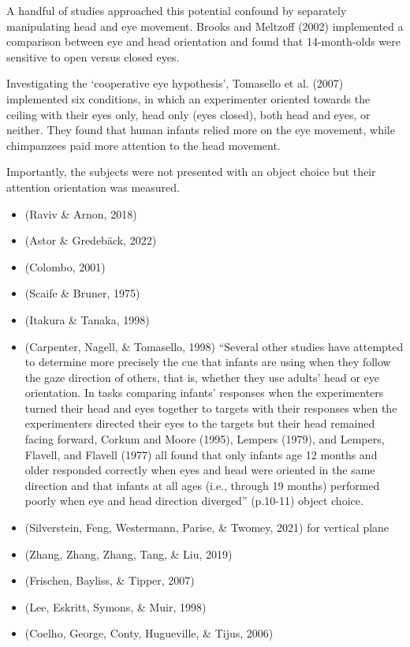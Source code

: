 \documentclass[
  man,floatsintext]{apa6}
\begin{document}
A handful of studies approached this potential confound by separately manipulating head and eye movement.
Brooks and Meltzoff (2002) implemented a comparison between eye and head orientation and found that 14-month-olds were sensitive to open versus closed eyes.

Investigating the `cooperative eye hypothesis', Tomasello et al. (2007) implemented six conditions, in which an experimenter oriented towards the ceiling with their eyes only, head only (eyes closed), both head and eyes, or neither.
They found that human infants relied more on the eye movement, while chimpanzees paid more attention to the head movement.

Importantly, the subjects were not presented with an object choice but their attention orientation was measured.

\begin{itemize}
\item
  (Raviv \& Arnon, 2018)
\item
  (Astor \& Gredebäck, 2022)
\item
  (Colombo, 2001)
\item
  (Scaife \& Bruner, 1975)
\item
  (Itakura \& Tanaka, 1998)
\item
  (Carpenter, Nagell, \& Tomasello, 1998) ``Several other studies have attempted to determine more precisely the cue that infants are using when they follow the gaze direction of others, that is, whether they use adults' head or eye orientation. In tasks comparing infants' responses when the experimenters turned their head and eyes together to targets with their responses when the experimenters directed their eyes to the targets but their head remained facing forward, Corkum and Moore (1995), Lempers (1979), and Lempers, Flavell, and Flavell (1977) all found that only infants age 12 months and older responded correctly when eyes and head were oriented in the same direction and that infants at all ages (i.e., through 19 months) performed poorly when eye and head direction diverged'' (p.10-11) object choice.
\item
  (Silverstein, Feng, Westermann, Parise, \& Twomey, 2021) for vertical plane
\item
  (Zhang, Zhang, Zhang, Tang, \& Liu, 2019)
\item
  (Frischen, Bayliss, \& Tipper, 2007)
\item
  (Lee, Eskritt, Symons, \& Muir, 1998)
\item
  (Coelho, George, Conty, Hugueville, \& Tijus, 2006)
\end{itemize}
\end{document}
